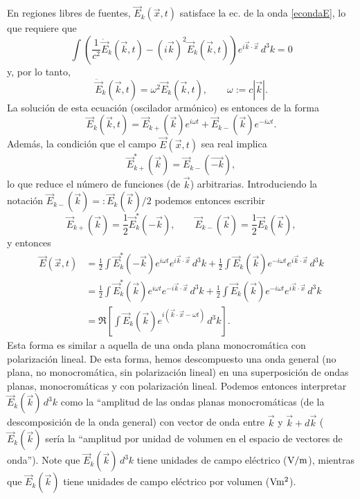 En regiones libres de fuentes, $\vec{E}_k(\vec{x},t)$ satisface la ec. de la onda \eqref{econdaE}, lo que requiere que 
\begin{equation}
\int\left(\frac{1}{c^2}\ddot{\vec{E}}_k(\vec{k},t)-(i\vec{k})^2\vec{E}_k(\vec{k},t)\right)e^{i\vec{k}\cdot\vec{x}}\,d^3k=0
\end{equation}
y, por lo tanto,
\begin{equation}
\ddot{\vec{E}}_k(\vec{k},t)=\omega^2\vec{E}_k(\vec{k},t), \qquad \omega:=c|\vec{k}|.
\end{equation}
La solución de esta ecuación (oscilador armónico) es entonces de la forma
\begin{equation}
\vec{E}_k(\vec{k},t) = \vec{E}_{k+}(\vec{k})e^{i\omega t}+\vec{E}_{k-}(\vec{k})e^{-i\omega t}.
\end{equation}
Además, la condición que el campo $\vec{E}(\vec{x},t)$ sea real implica
\begin{equation}
\vec{E}^*_{k+}(\vec{k}) = \vec{E}_{k-}(\vec{-k}),
\end{equation}
lo que reduce el número de funciones (de $\vec{k}$) arbitrarias. Introduciendo la notación $\vec{E}_{k-}(\vec{k}) =: \vec{E}_{k}(\vec{k})/2$ podemos entonces escribir
\begin{equation}
\vec{E}_{k+}(\vec{k}) = \frac{1}{2}\vec{E}^*_{k}(-\vec{k}),   \qquad \vec{E}_{k-}(\vec{k})= \frac{1}{2}\vec{E}_{k}(\vec{k}),
\end{equation}
y entonces
\begin{align}
\vec{E}(\vec{x},t) &= \frac{1}{2}\int\vec{E}^*_{k}(-\vec{k})e^{i\omega t}e^{i\vec{k}\cdot\vec{x}}\,d^3k + \frac{1}{2}\int\vec{E}_{k}(\vec{k})e^{-i\omega t}e^{i\vec{k}\cdot\vec{x}}\,d^3k \\
&= \frac{1}{2}\int\vec{E}^*_{k}(\vec{k})e^{i\omega t}e^{-i\vec{k}\cdot\vec{x}}\,d^3k + \frac{1}{2}\int\vec{E}_{k}(\vec{k})e^{-i\omega t}e^{i\vec{k}\cdot\vec{x}}\,d^3k \\
&= \Re\left[\int\vec{E}_{k}(\vec{k})e^{i(\vec{k}\cdot\vec{x}-\omega t)}\,d^3k\right].
\end{align}
Esta forma es similar a aquella de una onda plana monocromática con polarización lineal. De esta forma, hemos descompuesto una onda general (no plana, no monocromática, sin polarización lineal) en una superposición de ondas planas, monocromáticas y con polarización lineal. Podemos entonces interpretar $\vec{E}_{k}(\vec{k})\,d^3k$ como la ``amplitud de las ondas planas monocromáticas (de la descomposición de la onda general) con vector de onda entre $\vec{k}$ y $\vec{k}+d\vec{k}$ ($\vec{E}_{k}(\vec{k})$ sería la ``amplitud por unidad de volumen en el espacio de vectores de onda''). Note que $\vec{E}_{k}(\vec{k})\,d^3k$ tiene unidades de campo eléctrico ($\rm V/m$), mientras que $\vec{E}_{k}(\vec{k})$ tiene unidades de campo eléctrico por volumen ($\rm V m^2$).

